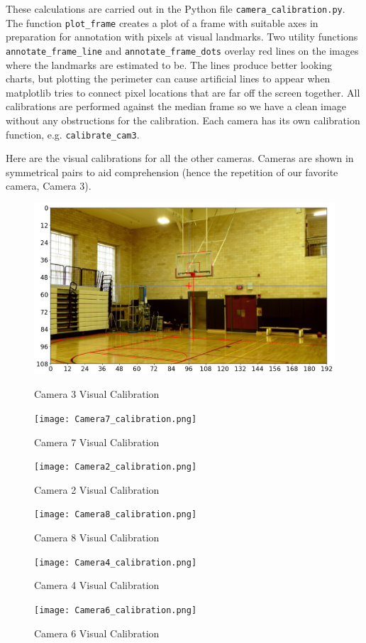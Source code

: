 \documentclass{article}
\begin{document}
These calculations are carried out in the Python file \texttt{camera\_calibration.py}.
The function \texttt{plot\_frame} creates a plot of a frame with suitable axes in preparation 
for annotation with pixels at visual landmarks.
Two utility functions \texttt{annotate\_frame\_line} and \texttt{annotate\_frame\_dots}
overlay red lines on the images where the landmarks are estimated to be.
The lines produce better looking charts, but plotting the perimeter can cause artificial 
lines to appear when matplotlib tries to connect pixel locations that are far off the screen together.
All calibrations are performed against the median frame so we have a clean image without
any obstructions for the calibration.
Each camera has its own calibration function, e.g. \texttt{calibrate\_cam3}.

Here are the visual calibrations for all the other cameras.
Cameras are shown in symmetrical pairs to aid comprehension
(hence the repetition of our favorite camera, Camera 3).
\newpage
\begin{figure}[H]
\center
\includegraphics[width=1.00\textwidth]{Camera3_calibration.png}
\caption*{Camera 3 Visual Calibration}
\texttt{[image: Camera7\_calibration.png]}
\caption*{Camera 7 Visual Calibration}
\end{figure}

\begin{figure}[H]
\texttt{[image: Camera2\_calibration.png]}
\caption*{Camera 2 Visual Calibration}

\texttt{[image: Camera8\_calibration.png]}
\caption*{Camera 8 Visual Calibration}
\end{figure}

\begin{figure}[H]
\texttt{[image: Camera4\_calibration.png]}
\caption*{Camera 4 Visual Calibration}

\texttt{[image: Camera6\_calibration.png]}
\caption*{Camera 6 Visual Calibration}
\end{figure}
\end{document}
